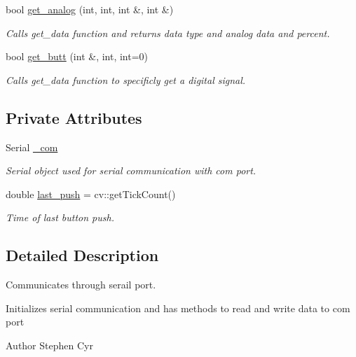 \begin{DoxyCompactItemize}
bool \hyperlink{class_c_control_a0b4ca36ae9a4b2a1ab98992ab35f2209}{get\+\_\+analog} (int, int, int \&, int \&)
\begin{DoxyCompactList}\small\item\em Calls get\+\_\+data function and returns data type and analog data and percent. \end{DoxyCompactList}\item 
bool \hyperlink{class_c_control_ad4a408390baa24847dc16cb49b64ddad}{get\+\_\+butt} (int \&, int, int=0)
\begin{DoxyCompactList}\small\item\em Calls get\+\_\+data function to specificly get a digital signal. \end{DoxyCompactList}\end{DoxyCompactItemize}
\subsection*{Private Attributes}
\begin{DoxyCompactItemize}
\item 
\hypertarget{class_c_control_aef87fbcfdcd323b1fdcf41be993e006c}{}\label{class_c_control_aef87fbcfdcd323b1fdcf41be993e006c} 
Serial \hyperlink{class_c_control_aef87fbcfdcd323b1fdcf41be993e006c}{\+\_\+com}
\begin{DoxyCompactList}\small\item\em Serial object used for serial communication with com port. \end{DoxyCompactList}\item 
\hypertarget{class_c_control_acf72e99f9fd9b389300b435c145a3bcb}{}\label{class_c_control_acf72e99f9fd9b389300b435c145a3bcb} 
double \hyperlink{class_c_control_acf72e99f9fd9b389300b435c145a3bcb}{last\+\_\+push} = cv\+::get\+Tick\+Count()
\begin{DoxyCompactList}\small\item\em Time of last button push. \end{DoxyCompactList}\end{DoxyCompactItemize}


\subsection{Detailed Description}
Communicates through serail port. 

Initializes serial communication and has methods to read and write data to com port

\begin{DoxyAuthor}{Author}
Stephen Cyr 
\end{DoxyAuthor}


